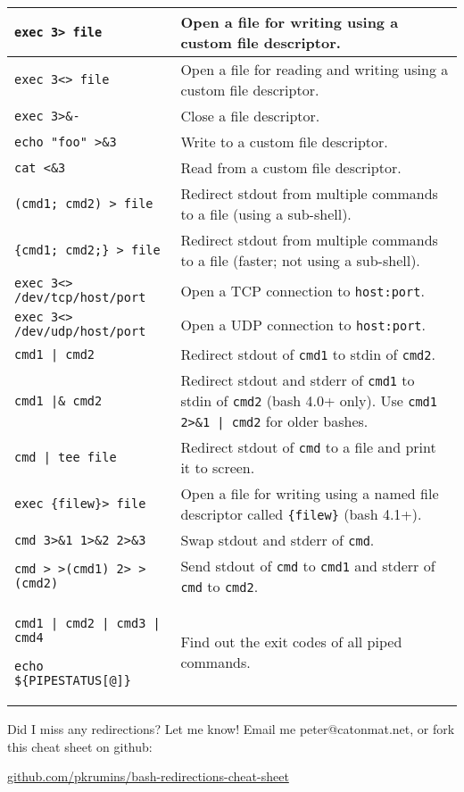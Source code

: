\documentclass{article}
\begin{document}
\begin{tabular}{|m{5.5cm}|m{12.2cm}|}
\hline
\verb|exec 3> file| & Open a file for writing using a custom file descriptor. \\
\hline
\verb|exec 3<> file| & Open a file for reading and writing using a custom file descriptor. \\
\hline
\verb|exec 3>&-| & Close a file descriptor. \\
\hline
\verb|echo "foo" >&3| & Write to a custom file descriptor. \\
\hline
\verb|cat <&3| & Read from a custom file descriptor. \\
\hline
\verb|(cmd1; cmd2) > file| & Redirect stdout from multiple commands to a file (using a sub-shell). \\
\hline
\verb|{cmd1; cmd2;} > file| & Redirect stdout from multiple commands to a file (faster; not using a sub-shell). \\
\hline
\verb|exec 3<> /dev/tcp/host/port| & Open a TCP connection to \verb|host:port|. \\
\hline
\verb|exec 3<> /dev/udp/host/port| & Open a UDP connection to \verb|host:port|. \\
\hline
\verb/cmd1 | cmd2/ & Redirect stdout of \verb|cmd1| to stdin of \verb|cmd2|. \\
\hline
\verb/cmd1 |& cmd2/ & Redirect stdout and stderr of \verb|cmd1| to stdin of \verb|cmd2| (bash 4.0+ only). Use \verb/cmd1 2>&1 | cmd2/ for older bashes. \\
\hline
\verb/cmd | tee file/ & Redirect stdout of \verb|cmd| to a file and print it to screen. \\
\hline
\verb|exec {filew}> file| & Open a file for writing using a named file descriptor called \verb|{filew}| (bash 4.1+). \\
\hline
\verb|cmd 3>&1 1>&2 2>&3| & Swap stdout and stderr of \verb|cmd|. \\
\hline
\verb|cmd > >(cmd1) 2> >(cmd2)| & Send stdout of \verb|cmd| to \verb|cmd1| and stderr of \verb|cmd| to \verb|cmd2|. \\
\hline
\verb/cmd1 | cmd2 | cmd3 | cmd4/ \par
\verb/echo ${PIPESTATUS[@]}/ & Find out the exit codes of all piped commands. \\
\hline
\end{tabular}

\vspace{0.4in}

Did I miss any redirections? Let me know! Email me peter@catonmat.net, or fork this cheat sheet on github: \par \href{http://github.com/pkrumins/bash-redirections-cheat-sheet}{github.com/pkrumins/bash-redirections-cheat-sheet}

\vfill

\end{document}
